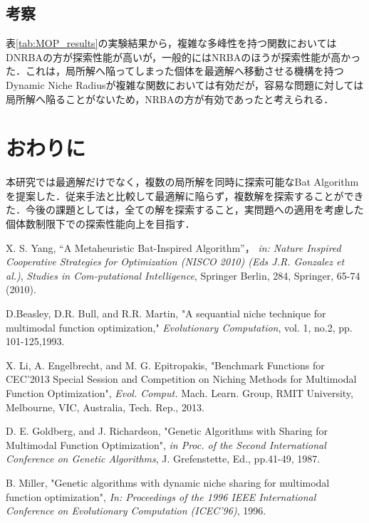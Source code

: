 \documentclass[twocolumn, a4paper]{UECIEresume}
\begin{document}
\subsection{考察}
表\ref{tab:MOP_results}の実験結果から，複雑な多峰性を持つ関数においてはDNRBAの方が探索性能が高いが，一般的にはNRBAのほうが探索性能が高かった．これは，局所解へ陥ってしまった個体を最適解へ移動させる機構を持つDynamic Niche Radiusが複雑な関数においては有効だが，容易な問題に対しては局所解へ陥ることがないため，NRBAの方が有効であったと考えられる．

\section{おわりに}
本研究では最適解だけでなく，複数の局所解を同時に探索可能なBat Algorithmを提案した．従来手法と比較して最適解に陥らず，複数解を探索することができた．今後の課題としては，全ての解を探索すること，実問題への適用を考慮した個体数制限下での探索性能向上を目指す．

{\small
\begin{thebibliography}{*}
 X. S. Yang, “A Metaheuristic Bat-Inspired Algorithm”， {\it in: Nature Inspired Cooperative Strategies for Optimization (NISCO 2010) (Eds J.R. Gonzalez et al.)}, {\it Studies in Com-putational Intelligence}, Springer Berlin, 284, Springer, 65-74 (2010).

 D.Beasley, D.R. Bull, and R.R. Martin, "A sequantial niche technique for multimodal function optimization," {\it Evolutionary Computation}, vol. 1, no.2, pp. 101-125,1993.

 X. Li, A. Engelbrecht, and M. G. Epitropakis, "Benchmark Functions for CEC'2013 Special Session and Competition on Niching Methods for Multimodal Function Optimization", {\it Evol. Comput.} Mach. Learn. Group, RMIT University, Melbourne, VIC, Australia, Tech. Rep., 2013.

 D. E. Goldberg, and J. Richardson, "Genetic Algorithms with Sharing for Multimodal Function Optimization", {\it in Proc. of the Second International Conference on Genetic Algorithms}, J. Grefenstette, Ed., pp.41-49, 1987.

 B. Miller, "Genetic algorithms with dynamic niche sharing for multimodal function optimization", {\it In: Proceedings of the 1996 IEEE International Conference on Evolutionary Computation (ICEC’96)}, 1996.
\end{thebibliography}
}
\end{document}

